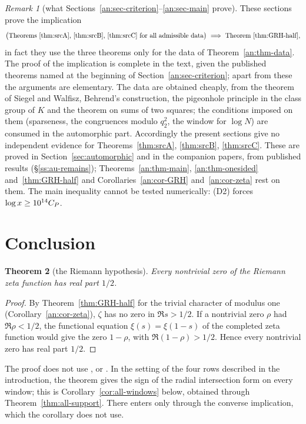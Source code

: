 \documentclass[10pt]{amsart}
\newtheorem{theorem}{Theorem}[section]
\theoremstyle{definition}
\theoremstyle{remark}
\newtheorem{remark}[theorem]{Remark}
\newcommand{\anThmA}{\ref{thm:srcA}}\newcommand{\anThmB}{\ref{thm:srcB}}\newcommand{\anThmC}{\ref{thm:srcC}}
\begin{document}
\begin{remark}[what Sections~\ref{an:sec-criterion}--\ref{an:sec-main} prove]\label{an:rem-status}
These sections prove the implication
\[
 \bigl(\text{Theorems \anThmA, \anThmB, \anThmC\ for all admissible data}\bigr)\ \Longrightarrow\ \text{Theorem~\ref{thm:GRH-half}},
\]
in fact they use the three theorems only for the data of
Theorem~\ref{an:thm-data}. The proof of the implication is complete in the
text, given the published theorems named at the beginning of
Section~\ref{an:sec-criterion}; apart from these the arguments are
elementary. The data are obtained cheaply, from the
theorem of Siegel and Walfisz, Behrend's construction, the pigeonhole
principle in the class group of $K$ and the theorem on sums of two squares;
the conditions imposed on them (sparseness, the congruences modulo $q_2^{2}$,
the window for $\log N$) are consumed in the automorphic part. Accordingly
the present sections give no independent evidence for
Theorems~\anThmA, \anThmB, \anThmC. These are proved in
Section~\ref{sec:automorphic} and in the companion papers, from published
results (\S\ref{ss:au-remains}); Theorems~\ref{an:thm-main},
\ref{an:thm-onesided} and~\ref{thm:GRH-half} and
Corollaries~\ref{an:cor-GRH} and~\ref{an:cor-zeta} rest on them. The main
inequality cannot be tested numerically: (D2) forces
$\log x\ge10^{14}C_P$.
\end{remark}



\providecommand{\anThmA}{\ref{thm:A}}
\providecommand{\anThmB}{\ref{thm:B}}
\providecommand{\anThmC}{\ref{thm:C}}
\section{Conclusion}\label{sec:conclusion}
\begin{theorem}[the Riemann hypothesis]\label{thm:RH}
Every nontrivial zero of the Riemann zeta function has real part $1/2$.
\end{theorem}
\begin{proof}
By Theorem~\ref{thm:GRH-half} for the trivial character of modulus one
(Corollary~\ref{an:cor-zeta}), $\zeta$ has no
zero in $\Re s>1/2$. If a nontrivial zero $\rho$ had $\Re\rho<1/2$, the
functional equation $\xi(s)=\xi(1-s)$ of the completed zeta function would
give the zero $1-\rho$, with $\Re(1-\rho)>1/2$. Hence every nontrivial zero
has real part $1/2$.
\end{proof}
The proof does not use \cite{P43}, \cite{P44} or \cite{Paper45}. In the
setting of the four rows described in the introduction, the theorem gives
the sign of the radial intersection form on every window; this is
Corollary~\ref{cor:all-windows} below, obtained through
Theorem~\ref{thm:all-support}. There \cite{Paper45} enters only through the
converse implication, which the corollary does not use.
\end{document}
